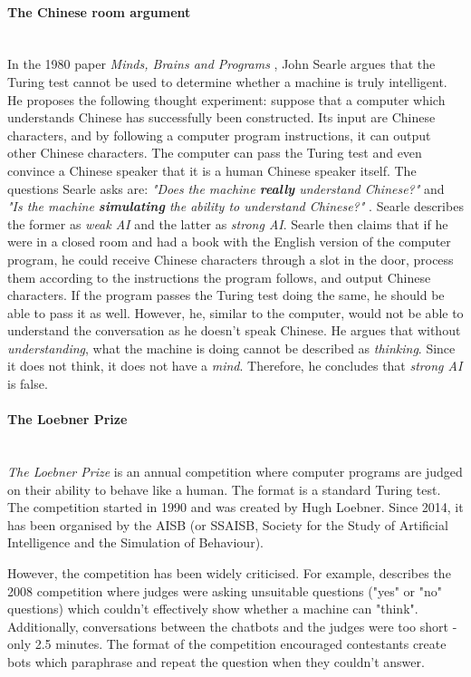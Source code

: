 \documentclass[12pt,a4paper]{article}
\newcommand{\myparagraph}[1]{\paragraph{#1}\mbox{}\\} %
\begin{document}
\myparagraph{The Chinese room argument}
In the 1980 paper \textit{Minds, Brains and Programs} \cite{Searle1980}, John Searle argues that the Turing test cannot be used to determine whether a machine is truly intelligent. He proposes the following thought experiment: suppose that a computer which understands Chinese has successfully been constructed. Its input are Chinese characters, and by following a computer program instructions, it can output other Chinese characters. The computer can pass the Turing test and even convince a Chinese speaker that it is a human Chinese speaker itself. The questions Searle asks are: \textit{"Does the machine \textbf{really} understand Chinese?"} and \textit{"Is the machine \textbf{simulating} the ability to understand Chinese?"} \cite[p.~2]{Searle1980}. Searle describes the former as \textit{weak AI} and the latter as \textit{strong AI}. Searle then claims that if he were in a closed room and had a book with the English version of the computer program, he could receive Chinese characters through a slot in the door, process them according to the instructions the program follows, and output Chinese characters. If the program passes the Turing test doing the same, he should be able to pass it as well. However, he, similar to the computer, would not be able to understand the conversation as he doesn't speak Chinese. He argues that without \textit{understanding}, what the machine is doing cannot be described as \textit{thinking}. Since it does not think, it does not have a \textit{mind}. Therefore, he concludes that \textit{strong AI} is false.

\myparagraph{The Loebner Prize}
\textit{The Loebner Prize} is an annual competition where computer programs are judged on their ability to behave like a human. The format is a standard Turing test. The competition started in 1990 and was created by Hugh Loebner. Since 2014, it has been organised by the AISB (or SSAISB, Society for the Study of Artificial Intelligence and the Simulation of Behaviour).

However, the competition has been widely criticised. For example, \cite{Floridi2009} describes the 2008 competition where judges were asking unsuitable questions ("yes" or "no" questions) which couldn't effectively show whether a machine can "think". Additionally, conversations between the chatbots and the judges were too short - only 2.5 minutes. The format of the competition encouraged contestants create bots which paraphrase and repeat the question when they couldn't answer.
\end{document}
